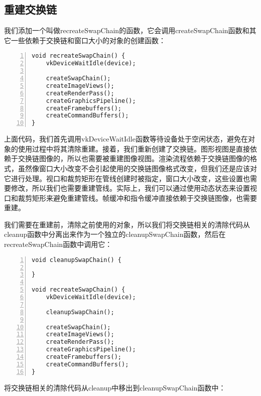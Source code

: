 \documentclass{ctexart}
\begin{document}
\subsection{重建交换链}

我们添加一个叫做recreateSwapChain的函数，它会调用createSwapChain函数和其它一些依赖于交换链和窗口大小的对象的创建函数：

\begin{lstlisting}[language={[ANSI]C},keywordstyle=\color{blue!70},commentstyle=\color{red!50!green!50!blue!50},frame=shadowbox, rulesepcolor=\color{red!20!green!20!blue!20},basicstyle=\small,numbers=left, numberstyle=\tiny,breaklines=true]
void recreateSwapChain() {
	vkDeviceWaitIdle(device);

	createSwapChain();
	createImageViews();
	createRenderPass();
	createGraphicsPipeline();
	createFramebuffers();
	createCommandBuffers();
}
\end{lstlisting}

上面代码，我们首先调用vkDeviceWaitIdle函数等待设备处于空闲状态，避免在对象的使用过程中将其清除重建。接着，我们重新创建了交换链。图形视图是直接依赖于交换链图像的，所以也需要被重建图像视图。渲染流程依赖于交换链图像的格式，虽然像窗口大小改变不会引起使用的交换链图像格式改变，但我们还是应该对它进行处理。视口和裁剪矩形在管线创建时被指定，窗口大小改变，这些设置也需要修改，所以我们也需要重建管线。实际上，我们可以通过使用动态状态来设置视口和裁剪矩形来避免重建管线。帧缓冲和指令缓冲直接依赖于交换链图像，也需要重建。

我们需要在重建前，清除之前使用的对象，所以我们将交换链相关的清除代码从cleanup函数中分离出来作为一个独立的cleanupSwapChain函数，然后在recreateSwapChain函数中调用它：

\begin{lstlisting}[language={[ANSI]C},keywordstyle=\color{blue!70},commentstyle=\color{red!50!green!50!blue!50},frame=shadowbox, rulesepcolor=\color{red!20!green!20!blue!20},basicstyle=\small,numbers=left, numberstyle=\tiny,breaklines=true]
void cleanupSwapChain() {

}

void recreateSwapChain() {
	vkDeviceWaitIdle(device);

	cleanupSwapChain();

	createSwapChain();
	createImageViews();
	createRenderPass();
	createGraphicsPipeline();
	createFramebuffers();
	createCommandBuffers();
}
\end{lstlisting}

将交换链相关的清除代码从cleanup中移出到cleanupSwapChain函数中：
\end{document}
